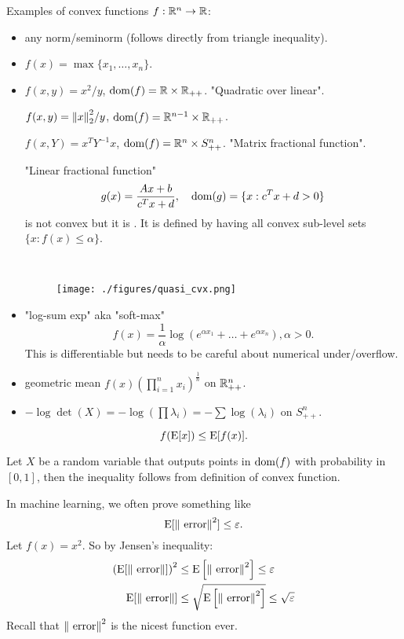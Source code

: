\documentclass[class=article,crop=false]{standalone}
\begin{document}
Examples of convex functions $ f: \mathbb{R}^{n} \to \mathbb{R}$:
\begin{itemize}
	\item any norm/seminorm (follows directly from triangle inequality).
	\item $ f(x) = \max\{x_1,\ldots,x_n\} $.
	\item $ f(x,y) = x^2 /y$, $ \operatorname{dom}(f) = \mathbb{R} \times \mathbb{R}_{++}$. "Quadratic over linear".

		$ f(x,y) = {\left\lVert{ x}\right\rVert}_2^2 /y $, $ \operatorname{dom}(f) = \mathbb{R}^{n-1} \times \mathbb{R}_{++}$.

		$ f(x,Y) = x^{T} Y^{-1} x$, $ \operatorname{dom}(f) = \mathbb{R}^{n} \times S_{++}^{n}$. "Matrix fractional function".
		\begin{note}
		"Linear fractional function"
		 \[
			 g(x) = \frac{Ax+b}{c^{T}x+ d }, \quad \operatorname{dom}(g) = \{x: c^{T}x+d >0\} 
		\] 
		is not convex but it is . It is defined by having all convex sub-level sets $ \{x: f(x) \leq \alpha\} $.  
		\end{note}
		~\begin{figure}[H]
			\centering
			\hspace*{-3cm}
			\texttt{[image: ./figures/quasi\_cvx.png]}
		\end{figure}
	\item "log-sum exp" aka "soft-max"
		\[
			f(x) = \frac{1}{\alpha} \log \left( e^{\alpha x_1} + \ldots + e^{\alpha x_n} \right) , \alpha > 0
		.\]
		This is differentiable but needs to be careful about numerical under/overflow.
	\item geometric mean $ f(x) \left( \prod_{ i= 1}^{ n} x_i \right)^{\frac{1}{n}} $ on $ \mathbb{R}_{++}^{n}$.
	\item $ - \log \det(X) =-\log\left( \prod \lambda_i \right) = - \sum \log(\lambda_i) $ on $ S_{++}^{n}$.
\end{itemize}


\begin{thm}
	\[
	f(\operatorname*{E} [x]) \leq \operatorname*{E} [f(x)]
	.\] 
\end{thm}
\begin{remark}
	Let $ X$ be a random variable that outputs points in  $ \operatorname{dom}(f)$ with probability in $ [0,1]$, then the inequality follows from definition of convex function.
\end{remark}
\begin{eg}
In machine learning, we often prove something like
\[
	\operatorname*{E}[{\left\lVert{ \text{ error} }\right\rVert}^2 ] \leq \varepsilon
.\]
Let $ f(x) = x^2$. So by Jensen's inequality:
\begin{align*}
	\left( \operatorname*{E}[ {\left\lVert{ \text{ error} }\right\rVert} ] \right) ^2 &\leq \operatorname*{E}\left[ {\left\lVert{ \text{ error} }\right\rVert}^2  \right]\leq \varepsilon \\
	\operatorname*{E}[{\left\lVert{ \text{ error} }\right\rVert} ] &\leq \sqrt{\operatorname*{E} \left[ {\left\lVert{ \text{ error} }\right\rVert}^2  \right] } \leq \sqrt{ \varepsilon} 
\end{align*}
Recall that $ {\left\lVert{ \text{ error} }\right\rVert}^2 $ is the nicest function ever.
\end{eg}
\end{document}
